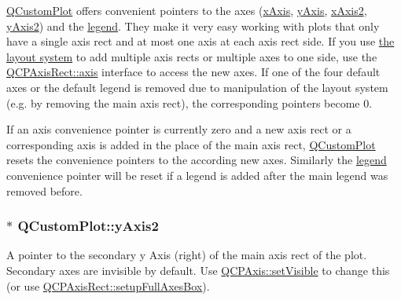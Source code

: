 \hyperlink{class_q_custom_plot}{Q\+Custom\+Plot} offers convenient pointers to the axes (\hyperlink{class_q_custom_plot_a9a79cd0158a4c7f30cbc702f0fd800e4}{x\+Axis}, \hyperlink{class_q_custom_plot_af6fea5679725b152c14facd920b19367}{y\+Axis}, \hyperlink{class_q_custom_plot_ada41599f22cad901c030f3dcbdd82fd9}{x\+Axis2}, \hyperlink{class_q_custom_plot_af13fdc5bce7d0fabd640f13ba805c0b7}{y\+Axis2}) and the \hyperlink{class_q_custom_plot_a4eadcd237dc6a09938b68b16877fa6af}{legend}. They make it very easy working with plots that only have a single axis rect and at most one axis at each axis rect side. If you use \hyperlink{}{the layout system} to add multiple axis rects or multiple axes to one side, use the \hyperlink{class_q_c_p_axis_rect_a560de44e47a4af0f86c59102a094b1e4}{Q\+C\+P\+Axis\+Rect\+::axis} interface to access the new axes. If one of the four default axes or the default legend is removed due to manipulation of the layout system (e.\+g. by removing the main axis rect), the corresponding pointers become 0.

If an axis convenience pointer is currently zero and a new axis rect or a corresponding axis is added in the place of the main axis rect, \hyperlink{class_q_custom_plot}{Q\+Custom\+Plot} resets the convenience pointers to the according new axes. Similarly the \hyperlink{class_q_custom_plot_a4eadcd237dc6a09938b68b16877fa6af}{legend} convenience pointer will be reset if a legend is added after the main legend was removed before. 
\subsubsection[{\texorpdfstring{y\+Axis2}{yAxis2}}]{ $\ast$ Q\+Custom\+Plot\+::y\+Axis2}\hypertarget{class_q_custom_plot_af13fdc5bce7d0fabd640f13ba805c0b7}{}\label{class_q_custom_plot_af13fdc5bce7d0fabd640f13ba805c0b7}
A pointer to the secondary y Axis (right) of the main axis rect of the plot. Secondary axes are invisible by default. Use \hyperlink{class_q_c_p_layerable_a3bed99ddc396b48ce3ebfdc0418744f8}{Q\+C\+P\+Axis\+::set\+Visible} to change this (or use \hyperlink{class_q_c_p_axis_rect_a5fa906175447b14206954f77fc7f1ef4}{Q\+C\+P\+Axis\+Rect\+::setup\+Full\+Axes\+Box}).

